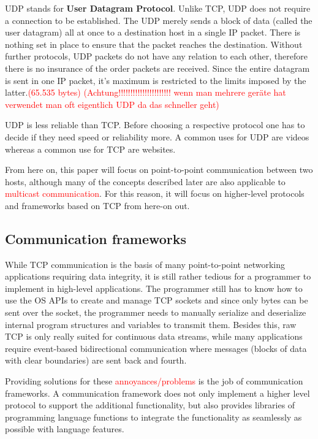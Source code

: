 \documentclass[conference]{IEEEtran}
\begin{document}
UDP stands for \textbf{User Datagram Protocol}. Unlike TCP, UDP does not require a connection to be established. The UDP merely sends a block of data (called the user datagram) all at once to a destination host in a single IP packet. There is nothing set in place to ensure that the packet reaches the destination. Without further protocols, UDP packets do not have any relation to each other, therefore there is no insurance of the order packets are received. Since the entire datagram is sent in one IP packet, it's maximum is restricted to the limits imposed by the latter.\textcolor{red}{(65.535 bytes)} \textcolor{red}{(Achtung!!!!!!!!!!!!!!!!!!!!!! wenn man mehrere geräte hat verwendet man oft eigentlich UDP da das schneller geht)}

UDP is less reliable than TCP. Before choosing a respective protocol one has to decide if they need speed or reliability more. A common uses for UDP are videos whereas a common use for TCP are websites.

From here on, this paper will focus on point-to-point communication between two hosts, although many of the concepts described later are also applicable to \textcolor{red}{multicast communication}.
For this reason, it will focus on higher-level protocols and frameworks based on TCP from here-on out.


\subsection{Communication frameworks}

While TCP communication is the basis of many point-to-point networking applications requiring data integrity, it is still rather tedious for a programmer to implement in high-level applications. The programmer still has to know how to use the OS APIs to create and manage TCP sockets and since only bytes can be sent over the socket, the programmer needs to manually serialize and deserialize internal program structures and variables to transmit them. Besides this, raw TCP is only really suited for continuous data streams, while many applications require event-based bidirectional communication where messages (blocks of data with clear boundaries) are sent back and fourth.

Providing solutions for these \textcolor{red}{annoyances/problems} is the job of communication frameworks. A communication framework does not only implement a higher level protocol to support the additional functionality, but also provides libraries of programming language functions to integrate the functionality as seamlessly as possible with language features.
\end{document}
